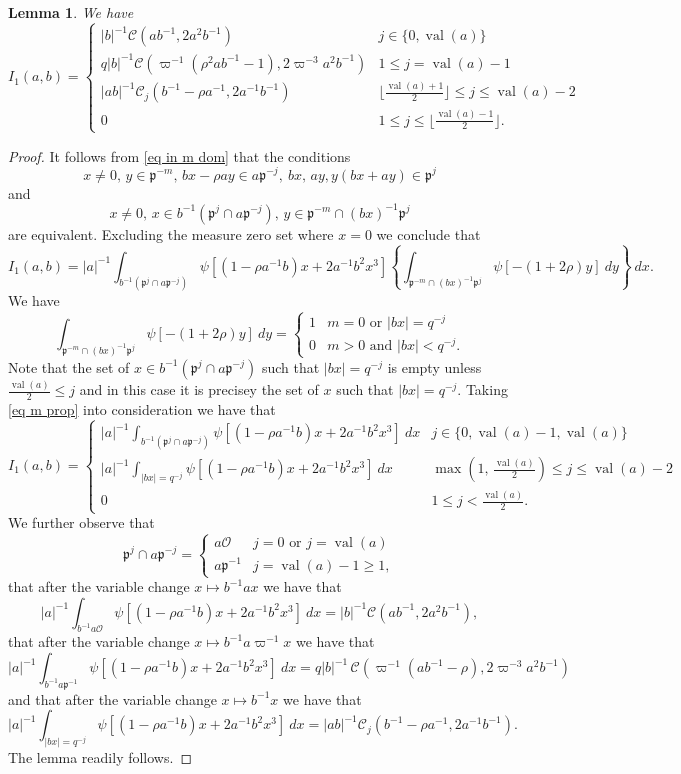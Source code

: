 \documentclass[12pt]{amsart}
\newcommand{\abs}[1]{\left|{#1}\right|}
\newcommand{\p}{\mathfrak{p}}
\renewcommand{\O}{\mathcal{O}}
\newcommand{\val}{{\operatorname{val}}}
\newcommand{\Cu}{\mathcal{C}}
\newtheorem{lemma}[theorem]{Lemma}
\theoremstyle{remark}
\begin{document}
\begin{lemma}\label{lem I1}
We have
\[
I_1(a,b)=\begin{cases}
\abs{b}^{-1}\Cu(ab^{-1},2a^2b^{-1}) & j\in\{0,\val(a)\} \\ 
q\abs{b}^{-1}\Cu(\varpi^{-1}(\rho^2ab^{-1}-1),2\varpi^{-3}a^2b^{-1}) & 1\le j=\val(a)-1 \\
\abs{ab}^{-1}\Cu_j(b^{-1}-\rho a^{-1},2a^{-1}b^{-1}) & \lfloor\frac{\val(a)+1}2\rfloor\le j\le \val(a)-2 \\ 
0 & 1\le j\le \lfloor\frac{\val(a)-1}2\rfloor.
\end{cases}
\]
\end{lemma} 
\begin{proof}
It follows from \eqref{eq in m dom} that the conditions 
\[
x\ne 0,\,y\in \p^{-m},\,bx-\rho ay\in a\p^{-j},\ bx,\,ay, y(bx+ay) \in \p^j
\]
and
\[
x\ne 0,\,x\in b^{-1}(\p^j\cap a\p^{-j}),\,y\in\p^{-m}\cap (bx)^{-1}\p^j
\]
are equivalent. Excluding the measure zero set where $x=0$ we conclude that 
\[
I_1(a,b)=\abs{a}^{-1} \int_{b^{-1}(\p^j\cap a\p^{-j})} \psi[(1-\rho a^{-1}b)x+2a^{-1}b^2x^3]  \left\{\int_{\p^{-m}\cap(bx)^{-1}\p^j}\psi[-(1+2\rho)y]\ dy\right\}\ dx.
\]
We have
\[
\int_{\p^{-m}\cap(bx)^{-1}\p^j}\psi[-(1+2\rho)y]\ dy=\begin{cases} 1 & m=0\text{ or } \abs{bx}=q^{-j} \\ 0 & m>0\text{ and } \abs{bx}<q^{-j}.\end{cases}
\]
Note that the set of $x\in b^{-1}(\p^j\cap a\p^{-j})$ such that $\abs{bx}=q^{-j}$ is empty unless $\frac{\val(a)}2\le j$ and in this case it is precisey the set of $x$ such that $\abs{bx}=q^{-j}$.
 Taking \eqref{eq m prop} into consideration we have that
\[
I_1(a,b)=\begin{cases} 
\abs{a}^{-1} \int_{b^{-1}(\p^j\cap a\p^{-j})} \psi[(1-\rho a^{-1}b)x+2a^{-1}b^2x^3]   \ dx & j\in \{0,\val(a)-1,\val(a)\} \\ 
\abs{a}^{-1} \int_{\abs{bx}=q^{-j}} \psi[(1-\rho a^{-1}b)x+2a^{-1}b^2x^3] \ dx &\max(1,\,\frac{\val(a)}2)\le j\le \val(a)-2 \\ 0 & 1\le j <\frac{\val(a)}2 . \end{cases}
\]
We further observe that
\[
\p^j\cap a\p^{-j}=\begin{cases} a\O & j=0\text{ or }j=\val(a) \\ a\p^{-1} & j=\val(a)-1\ge 1, \end{cases}
\]
that after the variable change $x\mapsto b^{-1}a x$ we have that
\[
\abs{a}^{-1} \int_{b^{-1}a\O} \psi[(1-\rho a^{-1}b)x+2a^{-1}b^2x^3]   \ dx=\abs{b}^{-1} \Cu(ab^{-1},2a^2b^{-1}),
\]
that after the variable change $x\mapsto b^{-1}a\varpi^{-1} x$ we have that
\[
\abs{a}^{-1}\int_{b^{-1}a\p^{-1}} \psi[(1-\rho a^{-1}b)x+2a^{-1}b^2x^3] \ dx=q\abs{b}^{-1}\,\Cu(\varpi^{-1}( ab^{-1}-\rho),2\varpi^{-3}a^2b^{-1})
\]
and that after the variable change $x\mapsto b^{-1} x$ we have that 
\[
\abs{a}^{-1} \int_{\abs{bx}=q^{-j}} \psi[(1-\rho a^{-1}b)x+2a^{-1}b^2x^3] \ dx=\abs{ab}^{-1} \Cu_j(b^{-1}-\rho a^{-1},2a^{-1}b^{-1}).
\]
The lemma readily follows.
\end{proof}
\end{document}
